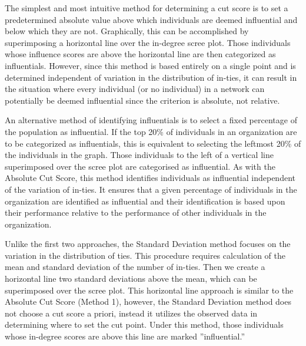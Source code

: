 
The simplest and most intuitive method for determining a cut score is to set a predetermined absolute value above which individuals are deemed influential and below which they are not. Graphically, this can be accomplished by superimposing a horizontal line over the in-degree scree plot. Those individuals whose influence scores are above the horizontal line are then categorized as influentials. However, since this method is based entirely on a single point and is determined independent of variation in the distribution of in-ties, it can result in the situation where every individual (or no individual) in a network can potentially be deemed influential since the criterion is absolute, not relative.


An alternative method of identifying influentials is to select a fixed percentage of the population as influential. If the top 20\% of individuals in an organization are to be categorized as influentials, this is equivalent to selecting the leftmost 20\% of the individuals in the graph. Those individuals to the left of a vertical line superimposed over the scree plot are categorised as influential. As with the Absolute Cut Score, this method identifies individuals as influential independent of the variation of in-ties. It ensures that a given percentage of individuals in the organization are identified as influential and their identification is based upon their performance relative to the performance of other individuals in the organization.


Unlike the first two approaches, the Standard Deviation method focuses on the variation in the distribution of ties. This procedure requires calculation of the mean and standard deviation of the number of in-ties. Then we create a horizontal line two standard deviations above the mean, which can be superimposed over the scree plot. This horizontal line approach is similar to the Absolute Cut Score (Method 1), however, the Standard Deviation method does not choose a cut score a priori, instead it utilizes the observed data in determining where to set the cut point. Under this method, those individuals whose in-degree scores are above this line are marked ''influential.''


